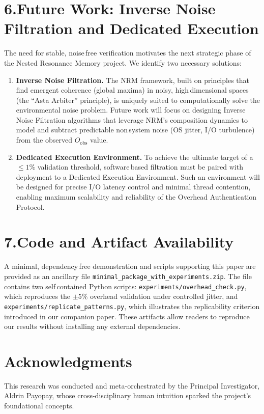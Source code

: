 \documentclass[11pt]{article}
\begin{document}
\section*{6.\quad Future Work: Inverse Noise Filtration and Dedicated Execution}
The need for stable, noise\,free verification motivates the next strategic phase of the Nested Resonance Memory project.  We identify two necessary solutions:
\begin{enumerate}
    \item \textbf{Inverse Noise Filtration.}  The NRM framework, built on principles that find emergent coherence (global maxima) in noisy, high\,dimensional spaces (the ``Asta Arbiter'' principle), is uniquely suited to computationally solve the environmental noise problem.  Future work will focus on designing Inverse Noise Filtration algorithms that leverage NRM's composition dynamics to model and subtract predictable non\,system noise (OS jitter, I/O turbulence) from the observed $O_{\text{obs}}$ value.
    \item \textbf{Dedicated Execution Environment.}  To achieve the ultimate target of a \(\le 1\%\) validation threshold, software\,based filtration must be paired with deployment to a Dedicated Execution Environment.  Such an environment will be designed for precise I/O latency control and minimal thread contention, enabling maximum scalability and reliability of the Overhead Authentication Protocol.
\end{enumerate}

\section*{7.\quad Code and Artifact Availability}
A minimal, dependency\,free demonstration and scripts supporting this paper are provided as an ancillary file \texttt{minimal\_package\_with\_experiments.zip}.  The file contains two self\,contained Python scripts: \texttt{experiments/overhead\_check.py}, which reproduces the \(\pm 5\%\) overhead validation under controlled jitter, and \texttt{experiments/replicate\_patterns.py}, which illustrates the replicability criterion introduced in our companion paper.  These artifacts allow readers to reproduce our results without installing any external dependencies.


\section*{Acknowledgments}

This research was conducted and meta-orchestrated by the Principal Investigator, Aldrin Payopay, whose cross-disciplinary human intuition sparked the project's foundational concepts.
\end{document}
